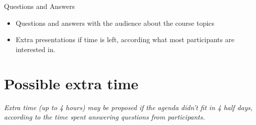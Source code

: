 \documentclass[a4paper,12pt,obeyspaces,spaces,hyphens]{article}
\begin{document}
\feagendaonecolumn
{Questions and Answers}
{
  \begin{itemize}
  \item Questions and answers with the audience about the course topics
  \item Extra presentations if time is left, according what most
        participants are interested in.
  \end{itemize}
}

\section{Possible extra time}

{\em Extra time (up to 4 hours) may be proposed if the agenda didn't fit in 4 half days,
     according to the time spent answering questions from participants.}
\end{document}
